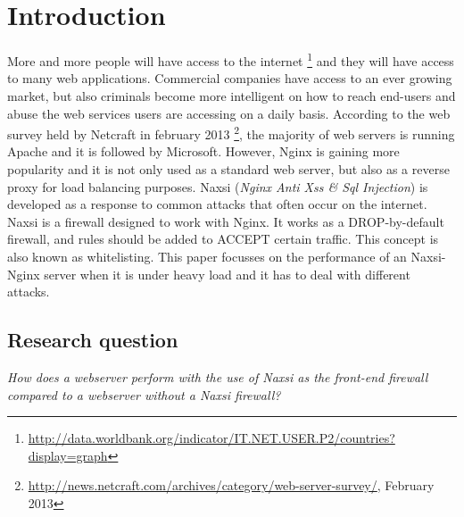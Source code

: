 \documentclass[Introduction]{subfiles}
\begin{document}
\section{Introduction}
\label{sec:Introduction}
More and more people will have access to the internet \footnote{\url{http://data.worldbank.org/indicator/IT.NET.USER.P2/countries?display=graph}} and they will have access to many web applications. Commercial companies have access to an ever growing market, but also criminals become more intelligent on how to reach end-users and abuse the web services users are accessing on a daily basis.
According to the web survey held by Netcraft in february 2013 \footnote{\url{http://news.netcraft.com/archives/category/web-server-survey/}, February 2013}, the majority of web servers is running Apache and it is followed by Microsoft. However, Nginx is gaining more popularity and it is not only used as a standard web server, but also as a reverse proxy for load balancing purposes. Naxsi (\emph{Nginx Anti Xss \& Sql Injection}) is developed as a response to common attacks that often occur on the internet. Naxsi is a firewall designed to work with Nginx. It works as a DROP-by-default firewall, and rules should be added to ACCEPT certain traffic. This concept is also known as whitelisting.
This paper focusses on the performance of an Naxsi-Nginx server when it is under heavy load and it has to deal with different attacks. 

\subsection{Research question}
\emph{How does a webserver perform with the use of Naxsi as the front-end firewall compared to a webserver without a Naxsi firewall?}
\end{document}
